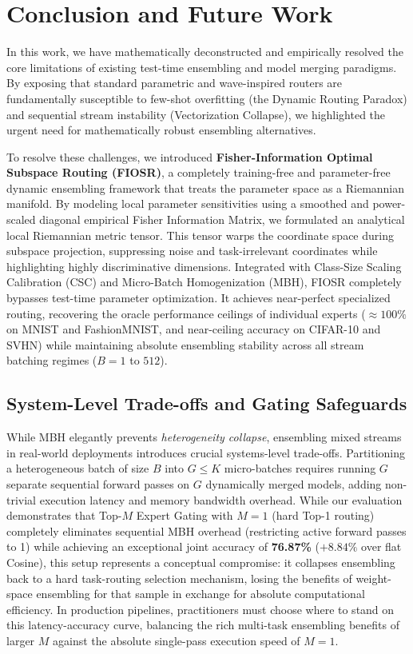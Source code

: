 \section{Conclusion and Future Work}
\label{sec:conclusion}

In this work, we have mathematically deconstructed and empirically resolved the core limitations of existing test-time ensembling and model merging paradigms. By exposing that standard parametric and wave-inspired routers are fundamentally susceptible to few-shot overfitting (the Dynamic Routing Paradox) and sequential stream instability (Vectorization Collapse), we highlighted the urgent need for mathematically robust ensembling alternatives.

To resolve these challenges, we introduced \textbf{Fisher-Information Optimal Subspace Routing (FIOSR)}, a completely training-free and parameter-free dynamic ensembling framework that treats the parameter space as a Riemannian manifold. By modeling local parameter sensitivities using a smoothed and power-scaled diagonal empirical Fisher Information Matrix, we formulated an analytical local Riemannian metric tensor. This tensor warps the coordinate space during subspace projection, suppressing noise and task-irrelevant coordinates while highlighting highly discriminative dimensions. Integrated with Class-Size Scaling Calibration (CSC) and Micro-Batch Homogenization (MBH), FIOSR completely bypasses test-time parameter optimization. It achieves near-perfect specialized routing, recovering the oracle performance ceilings of individual experts ($\approx 100\%$ on MNIST and FashionMNIST, and near-ceiling accuracy on CIFAR-10 and SVHN) while maintaining absolute ensembling stability across all stream batching regimes ($B=1$ to $512$).

\subsection{System-Level Trade-offs and Gating Safeguards}
While MBH elegantly prevents \emph{heterogeneity collapse}, ensembling mixed streams in real-world deployments introduces crucial systems-level trade-offs. Partitioning a heterogeneous batch of size $B$ into $G \le K$ micro-batches requires running $G$ separate sequential forward passes on $G$ dynamically merged models, adding non-trivial execution latency and memory bandwidth overhead. While our evaluation demonstrates that Top-$M$ Expert Gating with $M=1$ (hard Top-1 routing) completely eliminates sequential MBH overhead (restricting active forward passes to 1) while achieving an exceptional joint accuracy of \textbf{76.87\%} ($+8.84\%$ over flat Cosine), this setup represents a conceptual compromise: it collapses ensembling back to a hard task-routing selection mechanism, losing the benefits of weight-space ensembling for that sample in exchange for absolute computational efficiency. In production pipelines, practitioners must choose where to stand on this latency-accuracy curve, balancing the rich multi-task ensembling benefits of larger $M$ against the absolute single-pass execution speed of $M=1$.

